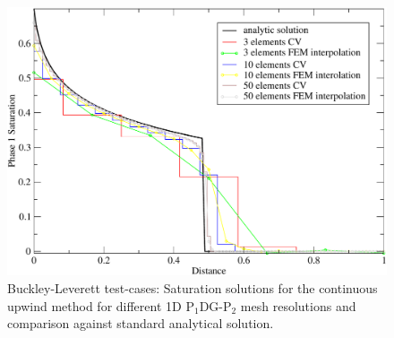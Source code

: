 


\begin{figure}[h]
\begin{center}
\includegraphics[width=1.\textwidth]{./diagrams/bl-exact-meth-upwind}
\end{center}
\caption{Buckley-Leverett test-cases: Saturation solutions for the continuous upwind method for different 1D P$_{1}$DG-P$_{2}$ mesh resolutions and comparison against standard analytical solution.
\label{bl-exact-meth-upwind}}
\end{figure}

